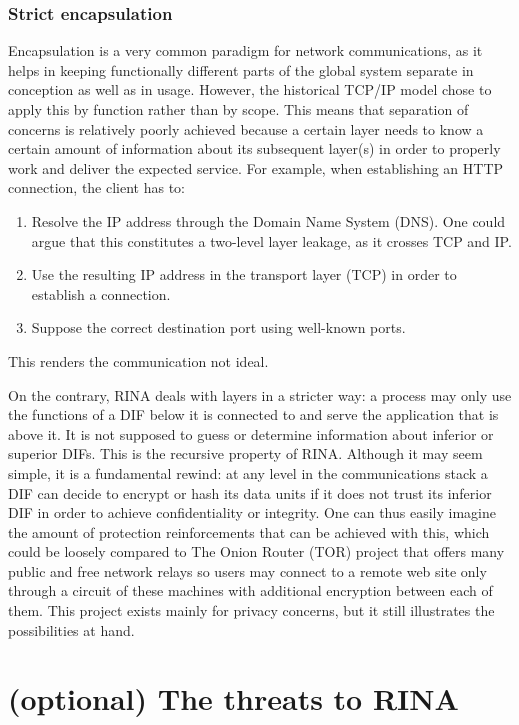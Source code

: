 \documentclass[a4paper]{proc}
\begin{document}
\section{Strict encapsulation}

\par Encapsulation is a very common paradigm for network communications, as it
helps in keeping functionally different parts of the global system separate in
conception as well as in usage. However, the historical TCP/IP model chose to
apply this by function rather than by scope. This means that separation of
concerns is relatively poorly achieved because a certain layer needs to know a
certain amount of information about its subsequent layer(s) in order to properly
work and deliver the expected service. For example, when establishing an HTTP
connection, the client has to:
\begin{enumerate}
    \item Resolve the IP address through the Domain Name System (DNS). One could
        argue that this constitutes a two-level layer leakage, as it crosses TCP
        and IP.
    \item Use the resulting IP address in the transport layer (TCP) in order to
        establish a connection.
    \item Suppose the correct destination port using well-known ports.
\end{enumerate}
This renders the communication not ideal.

\par On the contrary, RINA deals with layers in a stricter way: a process may
only use the functions of a DIF below it is connected to and serve the
application that is above it. It is not supposed to guess or determine
information about inferior or superior DIFs. This is the recursive property of
RINA. Although it may seem simple, it is a fundamental rewind: at any level in
the communications stack a DIF can decide to encrypt or hash its data units if
it does not trust its inferior DIF in order to achieve confidentiality or
integrity. One can thus easily imagine the amount of protection reinforcements
that can be achieved with this, which could be loosely compared to The Onion
Router (TOR) project that offers many public and free network relays so users
may connect to a remote web site only through a circuit of these machines with
additional encryption between each of them. This project exists mainly for
privacy concerns, but it still illustrates the possibilities at hand.


\part{(optional) The threats to RINA}

\nocite{*}
\newpage


\end{document}
